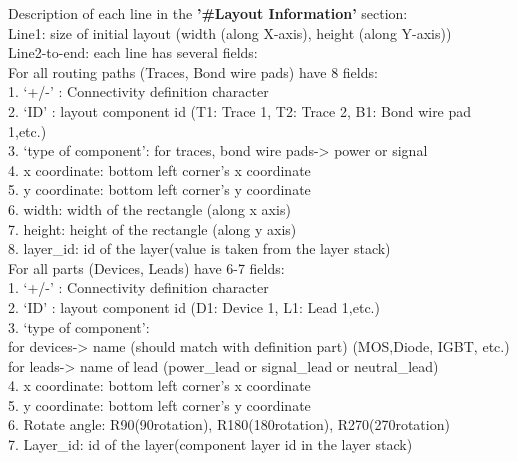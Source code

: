 \documentclass[11pt]{article}
\begin{document}
\begin{enumerate}
    Description of each line in the \textbf{'\#Layout Information'} section:\\
    Line1: size of initial layout (width (along X-axis), height (along Y-axis))\\
    Line2-to-end: each line has several fields:\\
    For all routing paths (Traces, Bond wire pads) have 8 fields:\\
    1.	‘+/-’ : Connectivity definition character\\
    2.	‘ID’ : layout component id (T1: Trace 1, T2: Trace 2, B1: Bond wire pad 1,etc.)\\
    3.	‘type of component’: for traces, bond wire pads-> power or signal\\
    4.	x coordinate: bottom left corner’s x coordinate\\
    5.	y coordinate: bottom left corner’s y coordinate\\
    6.	width: width of the rectangle (along x axis)\\
    7.	height: height of the rectangle (along y axis)\\
    8.	layer\_id: id of the layer(value is taken from the layer stack)\\
    For all parts (Devices, Leads) have 6-7 fields:\\
    1.	‘+/-’ : Connectivity definition character\\
    2.	‘ID’ : layout component id (D1: Device 1, L1: Lead 1,etc.)\\
    3.	‘type of component’:\\
    for devices-> name (should match with definition part)
    (MOS,Diode, IGBT, etc.)\\
    for leads-> name of lead (power\_lead or signal\_lead or neutral\_lead)\\
    4.  x coordinate: bottom left corner’s x coordinate\\
    5.	y coordinate: bottom left corner’s y coordinate\\
    6.	Rotate angle: R90(90\textdegree rotation), R180(180\textdegree rotation), R270(270\textdegree rotation)\\
    7.	Layer\_id: id of the layer(component layer id in the layer stack)\\

\end{enumerate}
\end{document}
